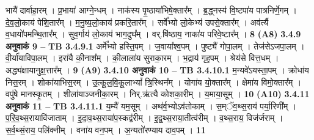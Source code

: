 \documentclass[17pt]{extarticle}
\begin{document}
{{{{{{{{{{{{{{{{{{{                  भायै॑ दार्वाहा॒रम् । प्र॒भाया॑ आग्ने॒न्धम् । नाक॑स्य पृ॒ष्ठाया॑भिषे॒क्तार᳚म् । ब्र॒द्ध्नस्य॑ वि॒ष्टपा॑य पात्रनिर्णे॒गम् । दे॒व॒लो॒काय॑ पेशि॒तार᳚म् । म॒नु॒ष्य॒लो॒काय॑ प्रकरि॒तार᳚म् । सर्वे᳚भ्यो लो॒केभ्य॑ उपसे॒क्तार᳚म् । अव॑र्त्यै व॒धायो॑पमन्थि॒तार᳚म् । सुव॒र्गाय॑ लो॒काय॑ भाग॒दुघ᳚म् । वर्.षि॑ष्ठाय॒ नाका॑य परिवे॒ष्टार᳚म् । \textbf{ 8} \newline
                  \newline
                                     \textbf{(A8)} \newline \newline
                \textbf{ 3.4.9     अनुवाकं   9 –} \newline
                                \textbf{ TB 3.4.9.1} \newline
                  अर्मे᳚भ्यो हस्ति॒पम् । ज॒वाया᳚श्व॒पम् । पुष्ट्यै॑ गोपा॒लम् । तेज॑सेऽजपा॒लम् । वी॒र्या॑याविपा॒लम् । इरा॑यै की॒नाश᳚म् । की॒लाला॑य सुराका॒रम् । भ॒द्राय॑ गृह॒पम् । श्रेय॑से वित्त॒धम् । अद्ध्य॑क्षायानुक्ष॒त्तार᳚म् । \textbf{ 9} \newline
                  \newline
                                     \textbf{(A9)} \newline \newline
                \textbf{ 3.4.10    अनुवाकं   10 –} \newline
                                \textbf{ TB 3.4.10.1} \newline
                  म॒न्यवे॑ऽयस्ता॒पम् । क्रोधा॑य निस॒रम् । शोका॑याभिस॒रम् । उ॒त्कू॒ल॒वि॒कू॒लाभ्यां᳚ त्रि॒स्थिन᳚म् । योगा॑य यो॒क्तार᳚म् । क्षेमा॑य विमो॒क्तार᳚म् । वपु॑षे मानस्कृ॒तम् । शीला॑याञ्जनीका॒रम् । निर्.ऋ॑त्यै कोशका॒रीम् । य॒माया॒सूम् । \textbf{ 10} \newline
                  \newline
                                     \textbf{(A10)} \newline \newline
                \textbf{ 3.4.11    अनुवाकं   11 –} \newline
                                \textbf{ TB 3.4.11.1} \newline
                  य॒म्यै॑ यम॒सूम् । अथ॑र्व॒भ्योऽव॑तोकाम् । स॒म्ॅव॒थ्स॒राय॑ पर्या॒रिणी᳚म् । प॒रि॒व॒थ्स॒रायावि॑जाताम् । इ॒दा॒व॒थ्स॒राया॑प॒स्कद्व॑रीम् । इ॒द्व॒थ्स॒राया॒तीत्व॑रीम् । व॒थ्स॒राय॒ विज॑र्जराम् । स॒र्व॒थ्सं॒राय॒ पलि॑क्नीम् । वना॑य वन॒पम् । अ॒न्यतो॑रण्याय दाव॒पम् । \textbf{ 11} \newline
                  \newline
}}}}}}}}}}}}}}}}}}}
\end{document}
